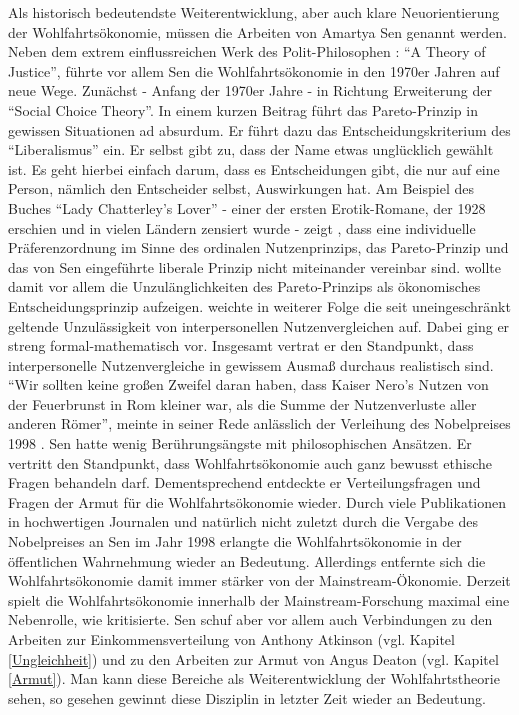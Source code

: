 Als historisch bedeutendste Weiterentwicklung, aber auch klare Neuorientierung der Wohlfahrtsökonomie, müssen die Arbeiten von Amartya Sen genannt werden. Neben dem extrem einflussreichen Werk des Polit-Philosophen \textcite{Rawls1971}: "`A Theory of Justice"',  führte vor allem Sen die Wohlfahrtsökonomie in den 1970er Jahren auf neue Wege. Zunächst - Anfang der 1970er Jahre - in Richtung Erweiterung der "`Social Choice Theory"'. In einem kurzen Beitrag führt \textcite{Sen1970} das Pareto-Prinzip in gewissen Situationen ad absurdum. Er führt dazu das Entscheidungskriterium des "`Liberalismus"' ein. Er selbst gibt zu, dass der Name etwas unglücklich gewählt ist. Es geht hierbei einfach darum, dass es Entscheidungen gibt, die nur auf eine Person, nämlich den Entscheider selbst, Auswirkungen hat. Am Beispiel des Buches "`Lady Chatterley's Lover"' - einer der ersten Erotik-Romane, der 1928 erschien und in vielen Ländern zensiert wurde - zeigt \textcite{Sen1970}, dass eine individuelle Präferenzordnung im Sinne des ordinalen Nutzenprinzips, das Pareto-Prinzip und das von Sen eingeführte liberale Prinzip nicht miteinander vereinbar sind. \textcite{Sen1970} wollte damit vor allem die Unzulänglichkeiten des Pareto-Prinzips als ökonomisches Entscheidungsprinzip aufzeigen. 
\textcite{Sen1970b} weichte in weiterer Folge die seit \textcite{Robbins1932} uneingeschränkt geltende Unzulässigkeit von interpersonellen Nutzenvergleichen auf. Dabei ging er streng formal-mathematisch vor. Insgesamt vertrat er den Standpunkt, dass interpersonelle Nutzenvergleiche in gewissem Ausmaß durchaus realistisch sind. "`Wir sollten keine großen Zweifel daran haben, dass Kaiser Nero's Nutzen von der Feuerbrunst in Rom kleiner war, als die Summe der Nutzenverluste aller anderen Römer"', meinte in seiner Rede anlässlich der Verleihung des Nobelpreises 1998 \parencite[S. 356]{Sen1999}. Sen hatte wenig Berührungsängste mit philosophischen Ansätzen. Er vertritt den Standpunkt, dass Wohlfahrtsökonomie auch ganz bewusst ethische Fragen behandeln darf. Dementsprechend entdeckte er Verteilungsfragen und Fragen der Armut für die Wohlfahrtsökonomie wieder. Durch viele Publikationen in hochwertigen Journalen und natürlich nicht zuletzt durch die Vergabe des Nobelpreises an Sen im Jahr 1998 erlangte die Wohlfahrtsökonomie in der öffentlichen Wahrnehmung wieder an Bedeutung. Allerdings entfernte sich die Wohlfahrtsökonomie damit immer stärker von der Mainstream-Ökonomie. Derzeit spielt die Wohlfahrtsökonomie innerhalb der Mainstream-Forschung maximal eine Nebenrolle, wie \textcite{Atkinson2011, Atkinson2001} kritisierte. Sen schuf aber vor allem auch Verbindungen zu den Arbeiten zur Einkommensverteilung von Anthony Atkinson (vgl. Kapitel \ref{Ungleichheit}) und zu den Arbeiten zur Armut von Angus Deaton (vgl. Kapitel \ref{Armut}). Man kann diese Bereiche als Weiterentwicklung der Wohlfahrtstheorie sehen, so gesehen gewinnt diese Disziplin in letzter Zeit wieder an Bedeutung.


